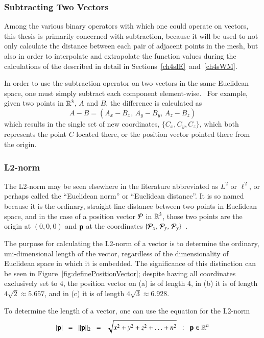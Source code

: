 %
%
\subsubsection{Subtracting Two Vectors}
\label{ch2sETBssLAsssS2V}
Among the various binary operators with which one could operate on vectors, this thesis is primarily concerned with subtraction, because it will be used to not only calculate the distance between each pair of adjacent points in the mesh, but also in order to interpolate and extrapolate the function values during the calculations of the  described in detail in Sections~\ref{ch4sIE}~and~\ref{ch4sWM}. 

In order to use the subtraction operator on two vectors in the same Euclidean space, one must simply subtract each component element-wise.~\cite{Weisstein19j} For example, given two points in $\mathbb{R}^{3}$, $A$ and $B$, the difference is calculated as
%
\begin{equation}
	A - B = (A_x - B_x,\,A_y - B_y,\,A_z - B_z)
	\label{eq:vectorSubtraction}
\end{equation}
%
which results in the single set of new coordinates, $\{C_x, C_y, C_z\}$, which both represents the point $C$ located there, or the position vector pointed there from the origin.

%
%
\subsubsection{L2-norm}
\label{ch2sETBssLAsssL2N}
The L2-norm may be seen elsewhere in the literature abbreviated as $L^2$ or $\ell^2$, or perhaps called the ``Euclidean norm'' or ``Euclidean distance''. It is so named because it is the ordinary, straight line distance between two points in Euclidean space, and in the case of a position vector $\mathcal{P}$ in $\mathbb{R}^{3}$, those two points are the origin at $(0, 0, 0)$ and $\mathbf{p}$ at the coordinates $\{\mathcal{P}_x,\,\mathcal{P}_y,\,\mathcal{P}_y\}$~\cite{Weisstein19h}.

The purpose for calculating the L2-norm of a vector is to determine the ordinary, uni-dimensional length of the vector, regardless of the dimensionality of Euclidean space in which it is embedded. The significance of this distinction can be seen in Figure~\ref{fig:definePositionVector}; despite having all coordinates exclusively set to $4$, the position vector on (a) is of length $4$, in (b) it is of length $4\sqrt{2} \approx 5.657$, and in (c) it is of length $4\sqrt{3} \approx 6.928$.

To determine the length of a vector, one can use the equation for the L2-norm
\begin{equation}
	|\mathbf{p}| \enspace=\enspace \|\mathbf{p}\|_2 \enspace=\enspace \sqrt{x^2 + y^2 + z^2 + \ldots + n^2} \enspace:\enspace \mathbf{p} \in \mathbb{R}^{n}
	\label{eq:l2norm}
\end{equation}

